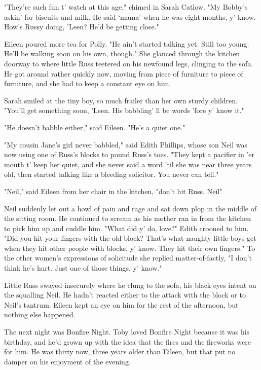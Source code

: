 "They're such fun t' watch at this age," chimed in Sarah Catlow. "My Bobby's askin' for biscuits and milk. He said `mama' when he was eight months, y' know. How's Russy doing, 'Leen? He'd be getting close."

Eileen poured more tea for Polly. "He ain't started talking yet. Still too young. He'll be walking soon on his own, though." She glanced through the kitchen doorway to where little Russ teetered on his newfound legs, clinging to the sofa. He got around rather quickly now, moving from piece of furniture to piece of furniture, and she had to keep a constant eye on him.

Sarah smiled at the tiny boy, so much frailer than her own sturdy children. "You'll get something soon, 'Leen. His babbling' ll be words 'fore y' know it."

"He doesn't babble either," said Eileen. "He's a quiet one."

"My cousin Jane's girl never babbled," said Edith Phillips, whose son Neil was now using one of Russ's blocks to pound Russ's toes. "They kept a pacifier in 'er mouth t' keep her quiet, and she never said a word 'til she was near three years old, then started talking like a bleeding solicitor. You never can tell."

"Neil," said Eileen from her chair in the kitchen, "don't hit Russ. Neil{\el}"

Neil suddenly let out a howl of pain and rage and sat down plop in the middle of the sitting room. He continued to scream as his mother ran in from the kitchen to pick him up and cuddle him. "What did y' do, love?" Edith crooned to him. "Did you hit your fingers with the old block? That's what naughty little boys get when they hit other people with blocks, y' know. They hit their own fingers." To the other women's expressions of solicitude she replied matter-of-factly, "I don't think he's hurt. Just one of those things, y' know."

Little Russ swayed insecurely where he clung to the sofa, his black eyes intent on the squalling Neil. He hadn't reacted either to the attack with the block or to Neil's tantrum. Eileen kept an eye on him for the rest of the afternoon, but nothing else happened.

The next night was Bonfire Night. Toby loved Bonfire Night because it was his birthday, and he'd grown up with the idea that the fires and the fireworks were for him. He was thirty now, three years older than Eileen, but that put no damper on his enjoyment of the evening.

